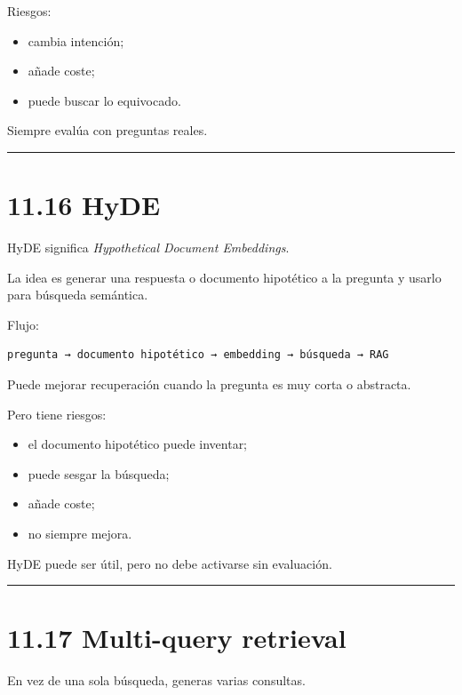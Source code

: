 Riesgos:

\begin{itemize}
\tightlist
\item
  cambia intención;
\item
  añade coste;
\item
  puede buscar lo equivocado.
\end{itemize}

Siempre evalúa con preguntas reales.

\begin{center}\rule{0.5\linewidth}{0.5pt}\end{center}

\section{11.16 HyDE}\label{hyde}

HyDE significa \emph{Hypothetical Document Embeddings}.

La idea es generar una respuesta o documento hipotético a la pregunta y
usarlo para búsqueda semántica.

Flujo:

\begin{lstlisting}
pregunta → documento hipotético → embedding → búsqueda → RAG
\end{lstlisting}

Puede mejorar recuperación cuando la pregunta es muy corta o abstracta.

Pero tiene riesgos:

\begin{itemize}
\tightlist
\item
  el documento hipotético puede inventar;
\item
  puede sesgar la búsqueda;
\item
  añade coste;
\item
  no siempre mejora.
\end{itemize}

HyDE puede ser útil, pero no debe activarse sin evaluación.

\begin{center}\rule{0.5\linewidth}{0.5pt}\end{center}

\section{11.17 Multi-query retrieval}\label{multi-query-retrieval}

En vez de una sola búsqueda, generas varias consultas.

